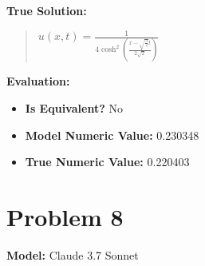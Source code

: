\documentclass{article}
\begin{document}
\textbf{True Solution:}
\begin{quote}
$u(x, t) = \frac{1}{4\cosh^2(\frac{x-\sqrt{\frac{3}{2}}t}{2\sqrt{2}})}$
\end{quote}

\textbf{Evaluation:}
\begin{itemize}
\item \textbf{Is Equivalent?} No
\item \textbf{Model Numeric Value:} 0.230348
\item \textbf{True Numeric Value:} 0.220403
\end{itemize}
\vspace{1cm}
\section*{Problem 8}
\textbf{Model:} Claude 3.7 Sonnet
\end{document}
